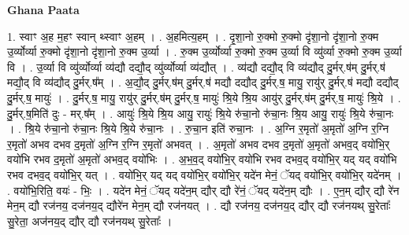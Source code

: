 \documentclass[17pt]{extarticle}
\begin{document}
\textbf{Ghana Paata } \newline

1. स्वाꣳ अ॒ह म॒हꣳ स्वान् थ्स्वाꣳ अ॒हम् । . अ॒हमित्य॒हम् । . दृ॒शा॒नो रु॒क्मो रु॒क्मो दृ॑शा॒नो दृ॑शा॒नो रु॒क्म उ॒र्व्योर्व्या रु॒क्मो दृ॑शा॒नो दृ॑शा॒नो रु॒क्म उ॒र्व्या । . रु॒क्म उ॒र्व्योर्व्या रु॒क्मो रु॒क्म उ॒र्व्या वि व्यु॑र्व्या रु॒क्मो रु॒क्म उ॒र्व्या वि । . उ॒र्व्या वि व्यु॑र्व्योर्व्या व्य॑द्यौ दद्यौ॒द् व्यु॑र्व्योर्व्या व्य॑द्यौत् । . व्य॑द्यौ दद्यौ॒द् वि व्य॑द्यौद् दु॒र्मर्.ष॑म् दु॒र्मर्.ष॑ मद्यौ॒द् वि व्य॑द्यौद् दु॒र्मर्.ष᳚म् । . अ॒द्यौ॒द् दु॒र्मर्.ष॑म् दु॒र्मर्.ष॑ मद्यौ दद्यौद् दु॒र्मर्.ष॒ मायु॒ रायु॑र् दु॒र्मर्.ष॑ मद्यौ दद्यौद् दु॒र्मर्.ष॒ मायुः॑ । . दु॒र्मर्.ष॒ मायु॒ रायु॑र् दु॒र्मर्.ष॑म् दु॒र्मर्.ष॒ मायुः॑ श्रि॒ये श्रि॒य आयु॑र् दु॒र्मर्.ष॑म् दु॒र्मर्.ष॒ मायुः॑ श्रि॒ये । . दु॒र्मर्.ष॒मिति॑ दुः - मर्.ष᳚म् । . आयुः॑ श्रि॒ये श्रि॒य आयु॒ रायुः॑ श्रि॒ये रु॑चा॒नो रु॑चा॒नः श्रि॒य आयु॒ रायुः॑ श्रि॒ये रु॑चा॒नः । . श्रि॒ये रु॑चा॒नो रु॑चा॒नः श्रि॒ये श्रि॒ये रु॑चा॒नः । . रु॒चा॒न इति॑ रुचा॒नः । . अ॒ग्नि र॒मृतो॑ अ॒मृतो॑ अ॒ग्नि र॒ग्नि र॒मृतो॑ अभव दभव द॒मृतो॑ अ॒ग्नि र॒ग्नि र॒मृतो॑ अभवत् । . अ॒मृतो॑ अभव दभव द॒मृतो॑ अ॒मृतो॑ अभव॒द् वयो॑भि॒र् वयो॑भि रभव द॒मृतो॑ अ॒मृतो॑ अभव॒द् वयो॑भिः । . अ॒भ॒व॒द् वयो॑भि॒र् वयो॑भि रभव दभव॒द् वयो॑भि॒र् यद् यद् वयो॑भि रभव दभव॒द् वयो॑भि॒र् यत् । . वयो॑भि॒र् यद् यद् वयो॑भि॒र् वयो॑भि॒र् यदे॑न मेनं॒ ॅयद् वयो॑भि॒र् वयो॑भि॒र् यदे॑नम् । . वयो॑भि॒रिति॒ वयः॑ - भिः॒ । . यदे॑न मेनं॒ ॅयद् यदे॑न॒म् द्यौर् द्यौ रे॑नं॒ ॅयद् यदे॑न॒म् द्यौः । . ए॒न॒म् द्यौर् द्यौ रे॑न मेन॒म् द्यौ रज॑नय॒ दज॑नय॒द् द्यौरे॑न मेन॒म् द्यौ रज॑नयत् । . द्यौ रज॑नय॒ दज॑नय॒द् द्यौर् द्यौ रज॑नयथ् सु॒रेताः᳚ सु॒रेता॒ अज॑नय॒द् द्यौर् द्यौ रज॑नयथ् सु॒रेताः᳚ । \newline
\end{document}
